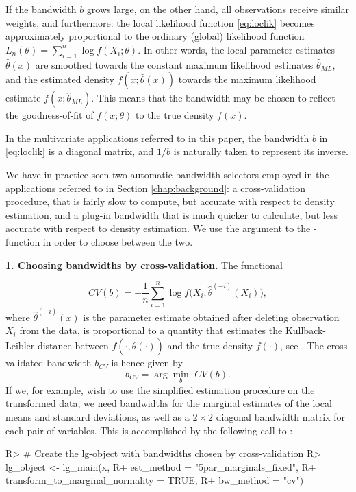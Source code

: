 If the bandwidth \(b\) grows large, on the other hand, all observations receive similar weights, and furthermore: the local likelihood function \eqref{eq:loclik} becomes approximately proportional to the ordinary (global) likelihood function \(L_n(\theta) = \sum_{i=1}^n\log f(X_i;\theta)\). In other words, the local parameter estimates \(\widehat \theta(x)\) are smoothed towards the constant maximum likelihood estimates \(\widehat\theta_{ML}\), and the estimated density \(f(x;\widehat\theta(x))\) towards the maximum likelihood estimate \(f(x;\widehat\theta_{ML})\). This means that the bandwidth may be chosen to reflect the goodness-of-fit of \(f(x;\theta)\) to the true density \(f(x)\).

In the multivariate applications referred to in this paper, the bandwidth \(b\) in \eqref{eq:loclik} is a diagonal matrix, and \(1/b\) is
naturally taken to represent its inverse. 

We have in practice seen two automatic bandwidth selectors employed in the applications referred to in Section \ref{chap:background}: a
cross-validation procedure, that is fairly slow to compute, but accurate with respect to density estimation, and a plug-in bandwidth that is much quicker to calculate, but less accurate with respect to density estimation. We use the argument
 to the -function in order to choose between the two.

\textbf{1. Choosing bandwidths by cross-validation.} The functional

\[CV(b) = -\frac{1}{n}\sum_{i=1}^n \log f\Big(X_i; \widehat\theta^{(-i)}(X_i)\Big),\]
where \(\widehat\theta^{(-i)}(x)\) is the parameter estimate obtained after deleting observation \(X_i\) from the data, is proportional to a quantity that estimates the Kullback-Leibler distance between \(f(\cdot, \widehat\theta(\cdot))\) and the true density \(f(\cdot)\), see \citet{bere:tjos:2014}. The cross-validated bandwidth \(b_{CV}\) is hence given by \[b_{CV} = \arg\min_b \,\, CV(b).\] If we, for example, wish to use the simplified estimation procedure on the transformed data, we need bandwidths for the marginal estimates of the local means and standard deviations, as well as a \(2\times2\) diagonal bandwidth matrix for each pair of variables. This is accomplished by the following call to :

\begin{example}
R> # Create the lg-object with bandwidths chosen by cross-validation
R> lg_object <- lg_main(x,
R+                      est_method = "5par_marginals_fixed",
R+                      transform_to_marginal_normality = TRUE,
R+                      bw_method = "cv")
\end{example}

